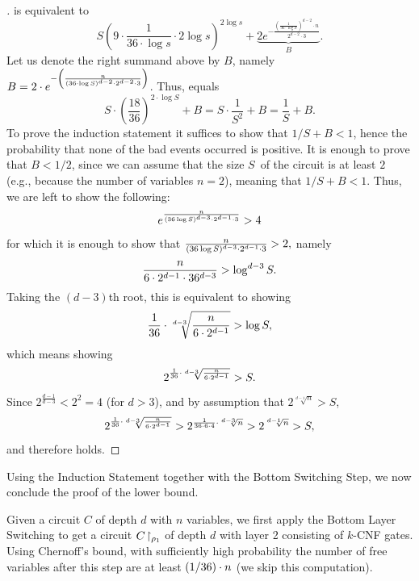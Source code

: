 \begin{proof}[]
 is equivalent to 
\begin{equation}\label{eq:498:27}
S \left( 9 \cdot \frac{1}{36 \cdot \log s} \cdot 2 \log s \right)^{2 \log s} + 
\underbrace{2 e^{-\frac{\left(\frac{1}{36 \cdot \log S }\right)^{d-2} \cdot n}{2^{d-2} \cdot 3}}}_B.
\end{equation}Let us denote the right summand above by $B$, namely $B=2\cdot
e^{-\left(\frac{n}{{(36 \cdot \log S)^{d-2} \cdot 2^{d-2} \cdot 3}}\right)}$.  
Thus,  equals
$$
S \cdot\left(\frac{18}{36}\right)^{2 \cdot \log S}+B =S \cdot \frac{1}{S^2}+B =
\frac{1}{S}+
B.
$$
To prove the induction statement it  suffices to show that $1/S+B<1$, hence the probability that none of the bad events occurred is positive. It is enough to prove  that $B<1/2$, since we can assume that the size $S$\ of the circuit is at least $2$ (e.g., because the number of variables $n=2$), meaning that $1/S+B<1$. Thus, we are left to show the following:
\[
e^{\frac{n}{(36 \log S)^{d-3} \cdot 2^{d-1}\cdot 3}} > 4
\]
for which it is enough to show that 
$
\frac{n}{(36 \log S)^{d-3} \cdot 2^{d-1}\cdot 3}>2,
$
namely
\[
\frac{n}{6 \cdot 2^{d-1}\cdot 36^{d-3}} > \log^{d-3} S.
\]
Taking the $(d-3)$th root, this is equivalent to showing 
\[
\frac{1}{36}\cdot \sqrt[d-3]{\frac{n}{6 \cdot 2^{d-1}}} > \log S,
\]
which means showing
\begin{equation}\label{eq:534:30}
2^{
\frac{1}{36}\cdot \sqrt[d-3]{\frac{n}{6 \cdot 2^{d-1}}}
} >  S.
\end{equation}
Since $2^{\frac{d-1}{d-3}} < 2^2 = 4$ (for $d>3$), and by assumption that $ 2^{
\sqrt[d-1]{n}
}>S$,    
$$
2^{
\frac{1}{36}\cdot \sqrt[d-3]{\frac{n}{6 \cdot 2^{d-1}}}}>
2^{
\frac{1}{36\cdot 6\cdot 4}\cdot\sqrt[d-3]{n}
}
> 2^{
\sqrt[d-1]{n}
}>S,
$$
and therefore   holds. 
\mbox{}
\end{proof} %


Using the Induction Statement  together with the Bottom Switching Step,
we now conclude the proof of the lower bound.

Given a circuit $C$ of depth $d$ with $n$ variables,
we first apply the Bottom Layer Switching to get a circuit  $C\!\upharpoonright_{\rho_1}$ of depth $d$ with layer 2 consisting of $k$-CNF gates. Using Chernoff's bound, with sufficiently high probability  the number of free variables after this step
are at least $(1/36)\cdot n$ (we skip this computation).

